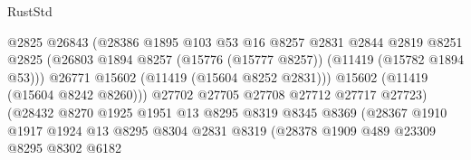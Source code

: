 \begin{lexlean}{RustStd}
\begin{coremodule}
                                        @2825
                                        @26843
                                        (@28386
                                          @1895
                                          @103
                                          @53
                                          @16
                                          @8257
                                          @2831
                                          @2844
                                          @2819
                                          @8251
                                          @2825
                                          (@26803
                                            @1894
                                            @8257
                                            (@15776 (@15777 @8257))
                                            (@11419 (@15782 @1894 @53)))
                                          @26771
                                          @15602
                                          (@11419 (@15604 @8252 @2831)))
                                        @15602
                                        (@11419 (@15604 @8242 @8260)))
                                      @27702
                                      @27705
                                      @27708
                                      @27712
                                      @27717
                                      @27723)
                                    (@28432
                                      @8270
                                      @1925
                                      @1951
                                      @13
                                      @8295
                                      @8319
                                      @8345
                                      @8369
                                      (@28367
                                        @1910
                                        @1917
                                        @1924
                                        @13
                                        @8295
                                        @8304
                                        @2831
                                        @8319
                                        (@28378
                                          @1909
                                          @489
                                          @23309
                                          @8295
                                          @8302
                                          @6182

\end{coremodule}
\end{lexlean}
